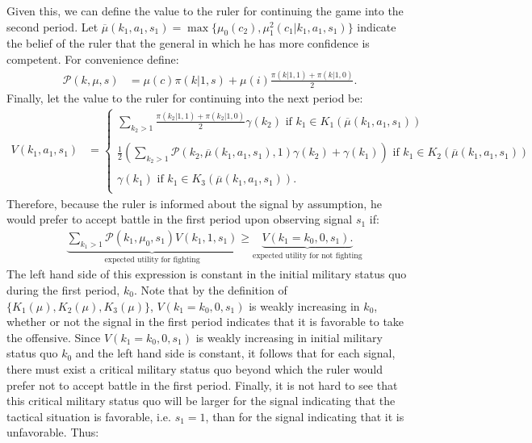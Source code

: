 \documentclass[11pt,]{article}
\begin{document}
Given this, we can define the value to the ruler for continuing the game into the second period.  Let $\overline{\mu}(k_1,a_1,s_1)=\max\{\mu_0(c_2),\mu_1^2(c_1|k_1,a_1,s_1)\}$ indicate the belief of the ruler that the general in which he has more confidence is competent.  For convenience define:
\begin{align*}
\mathcal{P}(k,\mu,s)&=\mu(c)\pi(k|1,s)+\mu(i)\frac{\pi(k|1,1)+\pi(k|1,0)}{2}.
\end{align*}Finally, let the value to the ruler for continuing into the next period be:
\begin{align*}
V(k_1,a_1,s_1)&=\left\{\begin{array}{l}
\sum_{k_2>1}\frac{\pi(k_2|1,1)+\pi(k_2|1,0)}{2}\gamma(k_2)\mbox{ if }k_1\in K_1(\overline{\mu}(k_1,a_1,s_1))\\
\\
\frac{1}{2}\left(\sum_{k_2>1}\mathcal{P}(k_2,\overline{\mu}(k_1,a_1,s_1),1)\gamma(k_2)+\gamma(k_1)\right)\mbox{ if }k_1\in K_2(\overline{\mu}(k_1,a_1,s_1))\\
\\
\gamma(k_1)\mbox{ if }k_1\in K_3(\overline{\mu}(k_1,a_1,s_1)).\\
\end{array}\right.
\end{align*}Therefore, because the ruler is informed about the signal by assumption, he would prefer to accept battle in the first period upon observing signal $s_1$ if:
\begin{align*}
&\underbrace{\sum_{k_1>1}\mathcal{P}(k_1,\mu_0,s_1)V(k_1,1,s_1)}_{\mbox{expected utility for fighting}} \geq\underbrace{V(k_1=k_0,0,s_1).}_{\mbox{expected utility for not fighting}}
\end{align*}The left hand side of this expression is constant in the initial military status quo during the first period, $k_0$.  Note that by the definition of $\{K_1(\mu),K_2(\mu),K_3(\mu)\}$, $V(k_1=k_0,0,s_1)$ is weakly increasing in $k_0$, whether or not the signal in the first period indicates that it is favorable to take the offensive.  Since $V(k_1=k_0,0,s_1)$ is weakly increasing in initial military status quo $k_0$ and the left hand side is constant, it follows that for each signal, there must exist a critical military status quo beyond which the ruler would prefer not to accept battle in the first period.  Finally, it is not hard to see that this critical military status quo will be larger for the signal indicating that the tactical situation is favorable, i.e. $s_1=1$, than for the signal indicating that it is unfavorable.  Thus:
\end{document}
